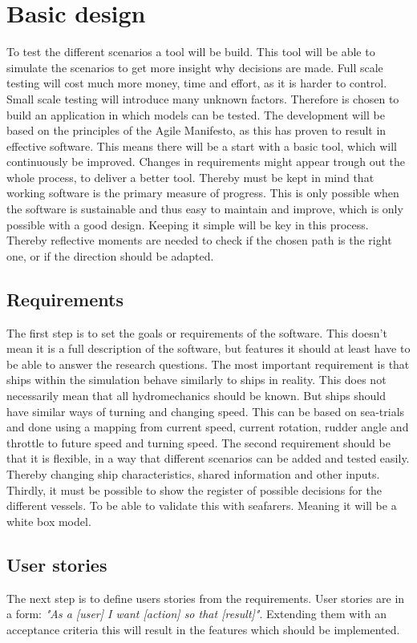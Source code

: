 \chapter{Basic design}
To test the different scenarios a tool will be build. This tool will be able to simulate the scenarios to get more insight why decisions are made. Full scale testing will cost much more money, time and effort, as it is harder to control. Small scale testing will introduce many unknown factors. Therefore is chosen to build an application in which models can be tested.
The development will be based on the principles of the Agile Manifesto, as this has proven to result in effective software. This means there will be a start with a basic tool, which will continuously be improved. Changes in requirements might appear trough out the whole process, to deliver a better tool. Thereby must be kept in mind that working software is the primary measure of progress. This is only possible when the software is sustainable and thus easy to maintain and improve, which is only possible with a good design. Keeping it simple will be key in this process. Thereby reflective moments are needed to check if the chosen path is the right one, or if the direction should be adapted. \cite{Agile2001}

\section{Requirements}
The first step is to set the goals or requirements of the software. This doesn't mean it is a full description of the software, but features it should at least have to be able to answer the research questions.
The most important requirement is that ships within the simulation behave similarly to ships in reality. This does not necessarily mean that all hydromechanics should be known. But ships should have similar ways of turning and changing speed. This can be based on sea-trials and done using a mapping from current speed, current rotation, rudder angle and throttle to future speed and turning speed.
The second requirement should be that it is flexible, in a way that different scenarios can be added and tested easily. Thereby changing ship characteristics, shared information and other inputs.
Thirdly, it must be possible to show the register of possible decisions for the different vessels. To be able to validate this with seafarers. Meaning it will be a white box model.

\section{User stories}
The next step is to define users stories from the requirements. User stories are in a form: \emph{"As a [user] I want [action] so that [result]"}. Extending them with an acceptance criteria this will result in the features which should be implemented.


